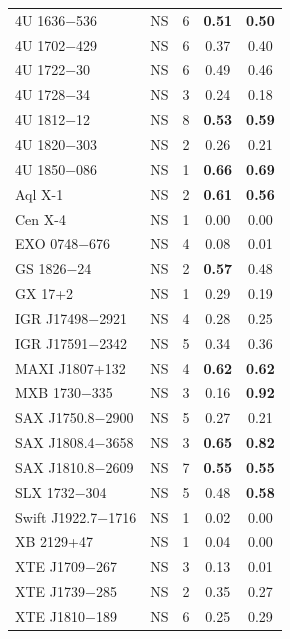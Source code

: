 {\begin{longtable}{@{}llrcc@{}}
4U 1636$-$536 & NS & 6 & \textbf{0.51} & \textbf{0.50} \\
4U 1702$-$429 & NS & 6 & 0.37 & 0.40 \\
4U 1722$-$30 & NS & 6 & 0.49 & 0.46 \\
4U 1728$-$34 & NS & 3 & 0.24 & 0.18 \\
4U 1812$-$12 & NS & 8 & \textbf{0.53} & \textbf{0.59} \\
4U 1820$-$303 & NS & 2 & 0.26 & 0.21 \\
4U 1850$-$086 & NS & 1 & \textbf{0.66} & \textbf{0.69} \\
Aql X-1 & NS & 2 & \textbf{0.61} & \textbf{0.56} \\
Cen X-4 & NS & 1 & 0.00 & 0.00 \\
EXO 0748$-$676 & NS & 4 & 0.08 & 0.01 \\
GS 1826$-$24 & NS & 2 & \textbf{0.57} & 0.48 \\
GX 17+2 & NS & 1 & 0.29 & 0.19 \\
IGR J17498$-$2921 & NS & 4 & 0.28 & 0.25 \\
IGR J17591$-$2342 & NS & 5 & 0.34 & 0.36 \\
MAXI J1807+132 & NS & 4 & \textbf{0.62} & \textbf{0.62} \\
MXB 1730$-$335 & NS & 3 & 0.16 & \textbf{0.92} \\
SAX J1750.8$-$2900 & NS & 5 & 0.27 & 0.21 \\
SAX J1808.4$-$3658 & NS & 3 & \textbf{0.65} & \textbf{0.82} \\
SAX J1810.8$-$2609 & NS & 7 & \textbf{0.55} & \textbf{0.55} \\
SLX 1732$-$304 & NS & 5 & 0.48 & \textbf{0.58} \\
Swift J1922.7$-$1716 & NS & 1 & 0.02 & 0.00 \\
XB 2129+47 & NS & 1 & 0.04 & 0.00 \\
XTE J1709$-$267 & NS & 3 & 0.13 & 0.01 \\
XTE J1739$-$285 & NS & 2 & 0.35 & 0.27 \\
XTE J1810$-$189 & NS & 6 & 0.25 & 0.29 \\
\end{longtable}}


